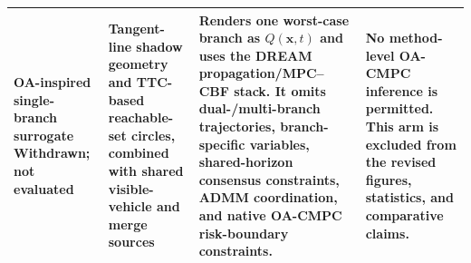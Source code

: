 \begin{table}[t]
\begin{tabularx}{\textwidth}{@{}p{}p{}p{}X@{}}
    OA-inspired single-branch surrogate
    \newline Withdrawn; not evaluated
    & Tangent-line shadow geometry and TTC-based reachable-set circles, combined with shared visible-vehicle and merge sources
    & Renders one worst-case branch as $Q(\mathbf{x},t)$ and uses the DREAM propagation/MPC--CBF stack.  It omits dual-/multi-branch trajectories, branch-specific variables, shared-horizon consensus constraints, ADMM coordination, and native OA-CMPC risk-boundary constraints.
    & No method-level OA-CMPC inference is permitted.  This arm is excluded from the revised figures, statistics, and comparative claims. \\
    \bottomrule
  \end{tabularx}
  \endgroup
\end{table}
